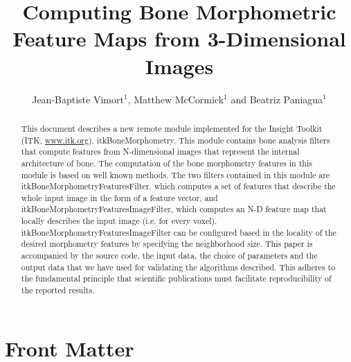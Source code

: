 \documentclass{InsightArticle}
\title{Computing Bone Morphometric Feature Maps from 3-Dimensional Images}
\author{Jean-Baptiste Vimort$^{1}$, Matthew McCormick$^{1}$ and Beatriz Paniagua$^{1}$}
\newcommand{\IJhandlerIDnumber}{3588}
\begin{document}
%
%
\IJhandlefooter{\IJhandlerIDnumber}


\ifpdf
\else
\fi

\maketitle

\ifhtml
\chapter*{Front Matter\label{front}}
\fi


\begin{abstract}
\noindent
This document describes a new remote module implemented for the Insight Toolkit (ITK, \url{www.itk.org}), itkBoneMorphometry. This module contains bone analysis filters that compute features from N-dimensional images that represent the internal architecture of bone. The computation of the bone morphometry features in this module is based on well known methods. The two filters contained in this module are itkBoneMorphometryFeaturesFilter. which computes a set of features that describe the whole input image in the form of a feature vector, and itkBoneMorphometryFeaturesImageFilter, which computes an N-D feature map that locally describes the input image (i.e. for every voxel). itkBoneMorphometryFeaturesImageFilter can be configured based in the locality of the desired morphometry features by specifying the neighborhood size. This paper is accompanied by the source code, the  input data, the choice of parameters and the output data that we have used for validating the algorithms described. This adheres to the fundamental principle that scientific publications must facilitate reproducibility of the reported results.

\end{abstract}
\end{document}
